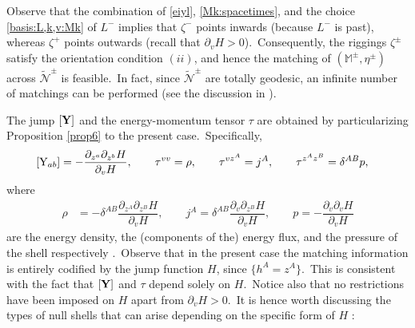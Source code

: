\documentclass[11pt]{article}
\numberwithin{equation}{section}
\def\Mkpm{\mathbb{M}^{\pm}}
\def\bY{\textup{\textbf{Y}}}
\def\Y{\textup{Y}}
\newcommand\N{\mathcal N}
\newcommand\rig{\zeta}
\def\bY{\textup{\textbf{Y}}}
\def\Y{\textup{Y}}
\newcommand{\cp}{\partial}
\newcommand{\nullhyp}{\widetilde{\N}}
\begin{document}
Observe that the combination of \eqref{eiyl}, \eqref{Mk:spacetimes}, and the choice \eqref{basis:L,k,v:Mk} of $L^-$ 
implies that $\rig^-$ points inwards 
(because $L^-$ is past), whereas $\rig^+$ points outwards (recall  
that $\cp_vH>0$).\ Consequently, the riggings $\rig^{\pm}$
satisfy the orientation condition  \hyperlink{junc-cond-FHD}{$(ii)$}, and hence the matching of $(\Mkpm,\eta^{\pm})$ across $\nullhyp^{\pm}$ is feasible.\ 
In fact, since $\nullhyp^{\pm}$ are totally geodesic,  an infinite number of matchings can be performed (see the discussion in \cite{manzano2022general,manzano2023matching}).\


The jump $[\bY]$ and the energy-momentum tensor $\tau$ are obtained by particularizing Proposition \ref{prop6} 
to the present case.\  
Specifically, 
\begin{align}
	\label{YpmMk:and:tauMk}
	[\Y_{ab}]&=-\dfrac{\cp_{z^a}\cp_{z^b}H}{\cp_{ v }H},\qquad 
	\tau^{vv}
	=\rho,  \qquad \tau^{vz^A}=j^A , \qquad \tau^{z^Az^B}=\delta^{AB}p,
\end{align}
where 
\begin{align}
	\label{def:eg:flux:pressure}  
	\rho&= -\delta^{AB}\dfrac{\cp_{z^A}\cp_{z^B}H}{\cp_{ v }H}, \qquad j^A= \delta^{AB}\dfrac{\cp_{v}\cp_{z^B}H}{\cp_{ v }H}, \qquad  p= -\dfrac{\cp_{v}\cp_{v}H}{\cp_{ v }H}  
\end{align}
are the energy density, the (components of the) energy flux, and the pressure of the shell respectively \cite{manzano2023matching,poisson2004relativist}.\ 
Observe that in the present case the matching information is entirely codified by the jump function $H$, since 
$\{h^A=z^A\}$.\ This is consistent with the fact that 
$[\bY]$ and $\tau$ depend solely on $H$.\ Notice also that no restrictions have been imposed on $H$ 
apart from $\cp_v H > 0$.\ It is hence worth discussing the types of null shells that can arise depending on the specific form of $H$ 
\cite{manzano2021null}: 
\end{document}
